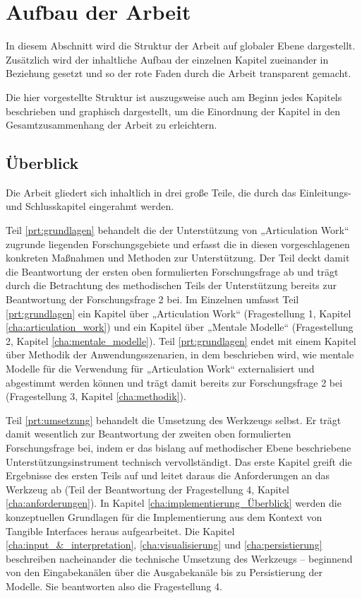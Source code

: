 
\section{Aufbau der Arbeit} %
\label{sec:aufbau_der_arbeit}

In diesem Abschnitt wird die Struktur der Arbeit auf globaler Ebene dargestellt. Zusätzlich wird der inhaltliche Aufbau der einzelnen Kapitel zueinander in Beziehung gesetzt und so der rote Faden durch die Arbeit transparent gemacht.

Die hier vorgestellte Struktur ist auszugsweise auch am Beginn jedes Kapitels beschrieben und graphisch dargestellt, um die Einordnung der Kapitel in den Gesamtzusammenhang der Arbeit zu erleichtern.

\subsection{Überblick} %
\label{sub:aufbau_ueberblick}

Die Arbeit gliedert sich inhaltlich in drei große Teile, die durch das Einleitungs- und Schlusskapitel eingerahmt werden.

Teil \ref{prt:grundlagen} behandelt die der Unterstützung von „Articulation Work“ zugrunde liegenden Forschungsgebiete und erfasst die in diesen vorgeschlagenen konkreten Maßnahmen und Methoden zur Unterstützung. Der Teil deckt damit die Beantwortung der ersten oben formulierten Forschungsfrage ab und trägt durch die Betrachtung des methodischen Teils der Unterstützung bereits zur Beantwortung der Forschungsfrage 2 bei. Im Einzelnen umfasst Teil \ref{prt:grundlagen} ein Kapitel über „Articulation Work“ (Fragestellung 1, Kapitel \ref{cha:articulation_work}) und ein Kapitel über „Mentale Modelle“ (Fragestellung 2, Kapitel \ref{cha:mentale_modelle}). Teil \ref{prt:grundlagen} endet mit einem Kapitel über Methodik der Anwendungsszenarien, in dem beschrieben wird, wie mentale Modelle für die Verwendung für „Articulation Work“ externalisiert und abgestimmt werden können und trägt damit bereits zur Forschungsfrage 2 bei (Fragestellung 3, Kapitel \ref{cha:methodik}).

Teil \ref{prt:umsetzung} behandelt die Umsetzung des Werkzeugs selbst. Er trägt damit wesentlich zur Beantwortung der zweiten oben formulierten Forschungsfrage bei, indem er das bislang auf methodischer Ebene beschriebene Unterstützungsinstrument technisch vervollständigt. Das erste Kapitel greift die Ergebnisse des ersten Teils auf und leitet daraus die Anforderungen an das Werkzeug ab (Teil der Beantwortung der Fragestellung 4, Kapitel \ref{cha:anforderungen}). In Kapitel \ref{cha:implementierung_Überblick} werden die konzeptuellen Grundlagen für die Implementierung aus dem Kontext von Tangible Interfaces heraus aufgearbeitet. Die Kapitel \ref{cha:input_&_interpretation}, \ref{cha:visualisierung} und \ref{cha:persistierung} beschreiben nacheinander die technische Umsetzung des Werkzeugs -- beginnend von den Eingabekanälen über die Ausgabekanäle bis zu Persistierung der Modelle. Sie beantworten also die Fragestellung 4. 

